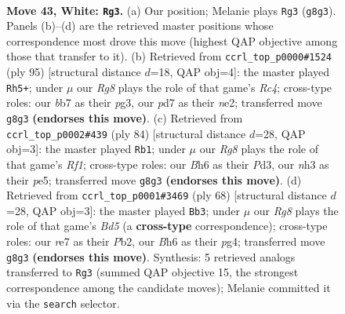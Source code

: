 \documentclass[11pt]{article}
\begin{document}
\clearpage

\begin{figure}[p]\centering
\begin{subfigure}{0.46\textwidth}\centering
\resizebox{\linewidth}{!}{%
\newchessgame
\chessboard[
  setfen={6R1/pb1pr3/7B/5k2/2B5/7n/PPK5/8 w - - 6 43},
  showmover=false,
  pgfstyle=straightmove, color=movearrow, markmove={g8-g3}
]}
\caption{}
\end{subfigure}\hfill
\begin{subfigure}{0.46\textwidth}\centering
\resizebox{\linewidth}{!}{%
\newchessgame
\chessboard[
  setfen={8/4pk2/7p/2r5/8/4bPPK/1R2N3/8 b - - 5 48},
  showmover=false,
  pgfstyle=straightmove, color=movearrow, markmove={c5-h5}
]}
\caption{}
\end{subfigure}
\\[4pt]
\begin{subfigure}{0.46\textwidth}\centering
\resizebox{\linewidth}{!}{%
\newchessgame
\chessboard[
  setfen={8/6k1/3r4/4p1b1/1p1pB3/3P4/7P/5R1K w - - 0 43},
  showmover=false,
  pgfstyle=straightmove, color=movearrow, markmove={f1-b1}
]}
\caption{}
\end{subfigure}\hfill
\begin{subfigure}{0.46\textwidth}\centering
\resizebox{\linewidth}{!}{%
\newchessgame
\chessboard[
  setfen={4r3/2p3k1/b7/3B3R/5Kp1/2P5/PP1p4/8 w - - 0 35},
  showmover=false,
  pgfstyle=straightmove, color=movearrow, markmove={d5-b3}
]}
\caption{}
\end{subfigure}
\caption{\textbf{Move 43, White: \texttt{Rg3}.} (a) Our position; Melanie plays \texttt{Rg3} (\texttt{g8g3}). Panels (b)--(d) are the retrieved master positions whose correspondence most drove this move (highest QAP objective among those that transfer to it). (b) Retrieved from \texttt{ccrl\_top\_p0000\#1524} (ply 95) [structural distance $d$=18, QAP obj=4]: the master played \texttt{Rh5+}; under $\mu$ our \emph{Rg8} plays the role of that game's \emph{Rc4}; cross-type roles: our \emph{b}b7 as their \emph{p}g3, our \emph{p}d7 as their \emph{n}e2; transferred move \texttt{g8g3} \textbf{(endorses this move)}. (c) Retrieved from \texttt{ccrl\_top\_p0002\#439} (ply 84) [structural distance $d$=28, QAP obj=3]: the master played \texttt{Rb1}; under $\mu$ our \emph{Rg8} plays the role of that game's \emph{Rf1}; cross-type roles: our \emph{B}h6 as their \emph{P}d3, our \emph{n}h3 as their \emph{p}e5; transferred move \texttt{g8g3} \textbf{(endorses this move)}. (d) Retrieved from \texttt{ccrl\_top\_p0001\#3469} (ply 68) [structural distance $d$=28, QAP obj=3]: the master played \texttt{Bb3}; under $\mu$ our \emph{Rg8} plays the role of that game's \emph{Bd5} (a \textbf{cross-type} correspondence); cross-type roles: our \emph{r}e7 as their \emph{P}b2, our \emph{B}h6 as their \emph{p}g4; transferred move \texttt{g8g3} \textbf{(endorses this move)}. Synthesis: 5 retrieved analogs transferred to \texttt{Rg3} (summed QAP objective 15, the strongest correspondence among the candidate moves); Melanie committed it via the \texttt{search} selector.}
\label{fig:thought-m84}
\end{figure}
\end{document}
